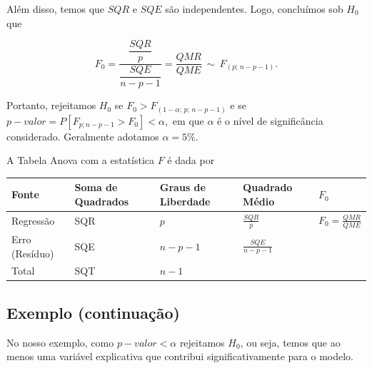 \documentclass[
]{book}
\begin{document}
Além disso, temos que \(SQR\) e \(SQE\) são independentes. Logo, concluímos sob \(H_0\) que

\[F_0=\dfrac{\dfrac{SQR}{p}}{\dfrac{SQE}{n-p-1}}= \dfrac{QMR}{QME}~\sim ~F_{(p ; \, n-p-1)}.\]

Portanto, rejeitamos \(H_0\) se \(F_0 > F_{(1-\alpha ; \, p ; \, n-p-1)}\) e se \(p-valor=P[F_{p;n-p-1} > F_0]<\alpha,\) em que \(\alpha\) é o nível de significância considerado. Geralmente adotamos \(\alpha=5\%.\)

A Tabela Anova com a estatística \(F\) é dada por

\begin{longtable}[]{@{}lllll@{}}
\toprule
Fonte & Soma de Quadrados & Graus de Liberdade & Quadrado Médio & \(F_0\) \\
\midrule
\endhead
Regressão & SQR & \(p\) & \(\frac{SQR}{p}\) & \(F_0=\frac{QMR}{QME}\) \\
Erro (Resíduo) & SQE & \(n-p-1\) & \(\frac{SQE}{n-p-1}\) & \\
Total & SQT & \(n-1\) & & \\
\bottomrule
\end{longtable}

\hypertarget{exemplo-continuauxe7uxe3o-1}{%
\subsection{Exemplo (continuação)}\label{exemplo-continuauxe7uxe3o-1}}

No nosso exemplo, como \(p-valor<\alpha\) rejeitamos \(H_0\), ou seja, temos que ao menos uma variável explicativa que contribui significativamente para o modelo.
\end{document}
